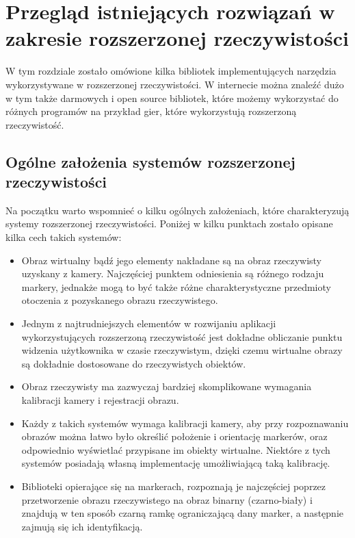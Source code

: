 \chapter{Przegląd istniejących rozwiązań w zakresie rozszerzonej rzeczywistości}
\label{cha:przegladIstniejacychRozwiazanWZakresieRozszerzonejRzeczywistosci}

W tym rozdziale zostało omówione kilka bibliotek implementujących narzędzia wykorzystywane w rozszerzonej rzeczywistości. W internecie można znaleźć dużo w tym także darmowych i open source bibliotek, które możemy wykorzystać do różnych programów na przykład gier, które wykorzystują rozszerzoną rzeczywistość.


\section{Ogólne założenia systemów rozszerzonej rzeczywistości}
\label{sec:ogolneZalozeniaSystemowRozszerzonejRzeczywistosci}

Na początku warto wspomnieć o kilku ogólnych założeniach, które charakteryzują systemy rozszerzonej rzeczywistości. Poniżej w kilku punktach zostało opisane kilka cech takich systemów:
\begin{itemize}
	\item Obraz wirtualny bądź jego elementy nakładane są na obraz rzeczywisty uzyskany z kamery. Najczęściej punktem odniesienia są różnego rodzaju markery, jednakże mogą to być także różne charakterystyczne przedmioty otoczenia z pozyskanego obrazu rzeczywistego.
	\item Jednym z najtrudniejszych elementów w rozwijaniu aplikacji wykorzystujących rozszerzoną rzeczywistość jest dokładne obliczanie punktu widzenia użytkownika w czasie rzeczywistym, dzięki czemu wirtualne obrazy są dokładnie dostosowane do rzeczywistych obiektów.
	\item Obraz rzeczywisty ma zazwyczaj bardziej skomplikowane wymagania kalibracji kamery i rejestracji obrazu.
	\item Każdy z takich systemów wymaga kalibracji kamery, aby przy rozpoznawaniu obrazów można łatwo było określić położenie i orientację markerów, oraz odpowiednio wyświetlać przypisane im obiekty wirtualne. Niektóre z tych systemów posiadają własną implementację umożliwiającą taką kalibrację. 
	\item Biblioteki opierające się na markerach, rozpoznają je najczęściej poprzez przetworzenie obrazu rzeczywistego na obraz binarny (czarno-biały) i znajdują w ten sposób czarną ramkę ograniczającą dany marker, a następnie zajmują się ich identyfikacją.
\end{itemize}

